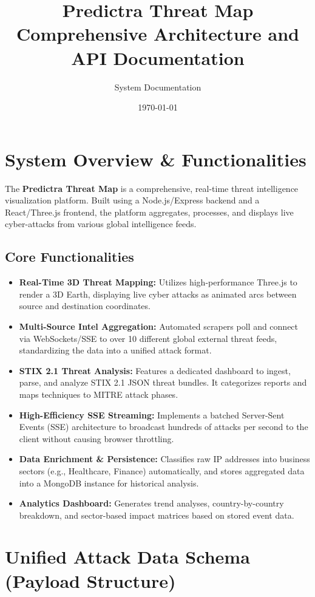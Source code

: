 \documentclass[12pt,a4paper]{article}
\title{Predictra Threat Map \\ \large Comprehensive Architecture and API Documentation}
\author{System Documentation}
\date{\today}
\begin{document}
\maketitle
\tableofcontents
\newpage

\section{System Overview \& Functionalities}

The \textbf{Predictra Threat Map} is a comprehensive, real-time threat intelligence visualization platform. Built using a Node.js/Express backend and a React/Three.js frontend, the platform aggregates, processes, and displays live cyber-attacks from various global intelligence feeds.

\subsection{Core Functionalities}
\begin{itemize}
    \item \textbf{Real-Time 3D Threat Mapping:} Utilizes high-performance Three.js to render a 3D Earth, displaying live cyber attacks as animated arcs between source and destination coordinates.
    \item \textbf{Multi-Source Intel Aggregation:} Automated scrapers poll and connect via WebSockets/SSE to over 10 different global external threat feeds, standardizing the data into a unified attack format.
    \item \textbf{STIX 2.1 Threat Analysis:} Features a dedicated dashboard to ingest, parse, and analyze STIX 2.1 JSON threat bundles. It categorizes reports and maps techniques to MITRE attack phases.
    \item \textbf{High-Efficiency SSE Streaming:} Implements a batched Server-Sent Events (SSE) architecture to broadcast hundreds of attacks per second to the client without causing browser throttling.
    \item \textbf{Data Enrichment \& Persistence:} Classifies raw IP addresses into business sectors (e.g., Healthcare, Finance) automatically, and stores aggregated data into a MongoDB instance for historical analysis.
    \item \textbf{Analytics Dashboard:} Generates trend analyses, country-by-country breakdown, and sector-based impact matrices based on stored event data.
\end{itemize}

\newpage
\section{Unified Attack Data Schema (Payload Structure)}
\end{document}
